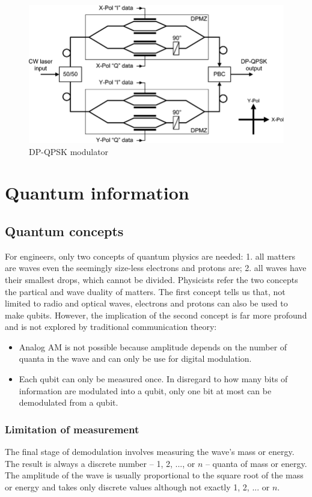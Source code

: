 \documentclass{book}
\begin{document}
\begin{figure}[h]
\includegraphics[width=12cm]{pic/DP-QPSK-modulator.png}
\caption{DP-QPSK modulator}
\label{DP-QPSK}
\end{figure}

\chapter{Quantum information}\label{C-qi}
\section{Quantum concepts}
For engineers, only two concepts of quantum physics are needed: 1. all matters are waves even the seemingly size-less electrons and protons are; 2. all waves have their smallest drops, which cannot be divided. Physicists refer the two concepts the partical and wave duality of matters. The first concept tells us that, not limited to radio and optical waves, electrons and protons can also be used to make qubits. However, the implication of the second concept is far more profound and is not explored by traditional communication theory:

\begin{itemize}
    \item Analog AM is not possible because amplitude depends on the number of quanta in the wave and can only be use for digital modulation. 
    \item Each qubit can only be measured once. In disregard to how many bits of information are modulated into a qubit, only one bit at most can be demodulated from a qubit.
\end{itemize}

\subsection{Limitation of measurement}
The final stage of demodulation involves measuring the wave's mass or energy. The result is always a discrete number -- 1, 2, ..., or $n$ -- quanta of mass or energy. The amplitude of the wave is usually proportional to the square root of the mass or energy and takes only discrete values although not exactly 1, 2, ... or $n$.
\end{document}
